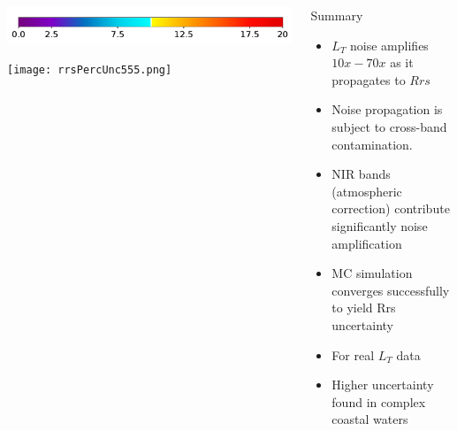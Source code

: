 \documentclass[final]{beamer}
\newlength{\sepwid}
\newlength{\onecolwid}
\newlength{\twocolwid}
\begin{document}
\begin{frame}[t]
\begin{columns}[t]
\begin{column}{\twocolwid}
\begin{framed}
\begin{center}
\includegraphics[trim =0 10 0 50,clip,width=0.5\linewidth,keepaspectratio]{rrsUNCcolorbar.png}


\texttt{[image: rrsPercUnc555.png]}
\end{center}
\end{framed}

\begin{columns}[t,totalwidth=\twocolwid] %
\begin{column}{\onecolwid} %







\end{column} %

\end{columns} %

\end{column} %


\begin{column}{\onecolwid} %

\begin{block}{Summary}
\begin{itemize}
\item $L_T$ noise amplifies $10x - 70x$ as it propagates to $Rrs$
\item Noise propagation is subject to cross-band contamination.
\item NIR bands (atmospheric correction) contribute significantly  noise amplification 
\item MC simulation converges successfully to yield Rrs uncertainty 
\item For real $L_T$ data
\item Higher uncertainty found in complex coastal waters
\end{itemize}
\end{block}


\end{column}
\end{columns}
\end{frame}
\end{document}
